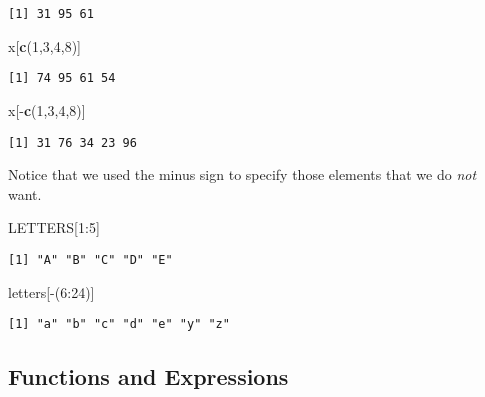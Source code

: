 \documentclass[]{book}
\newenvironment{Shaded}{\begin{snugshade}}{\end{snugshade}}
\newcommand{\KeywordTok}[1]{\textcolor[rgb]{0.13,0.29,0.53}{\textbf{{#1}}}}
\newcommand{\DecValTok}[1]{\textcolor[rgb]{0.00,0.00,0.81}{{#1}}}
\newcommand{\NormalTok}[1]{{#1}}
\numberwithin{equation}{chapter}
\numberwithin{figure}{chapter}
\theoremstyle{plain}
\theoremstyle{definition}
\theoremstyle{remark}
\theoremstyle{definition}
\theoremstyle{definition}
\theoremstyle{remark}
\begin{document}
\begin{verbatim}
[1] 31 95 61
\end{verbatim}

\begin{Shaded}
\begin{Highlighting}[]
\NormalTok{x[}\KeywordTok{c}\NormalTok{(}\DecValTok{1}\NormalTok{,}\DecValTok{3}\NormalTok{,}\DecValTok{4}\NormalTok{,}\DecValTok{8}\NormalTok{)]}
\end{Highlighting}
\end{Shaded}

\begin{verbatim}
[1] 74 95 61 54
\end{verbatim}

\begin{Shaded}
\begin{Highlighting}[]
\NormalTok{x[-}\KeywordTok{c}\NormalTok{(}\DecValTok{1}\NormalTok{,}\DecValTok{3}\NormalTok{,}\DecValTok{4}\NormalTok{,}\DecValTok{8}\NormalTok{)]}
\end{Highlighting}
\end{Shaded}

\begin{verbatim}
[1] 31 76 34 23 96
\end{verbatim}

Notice that we used the minus sign to specify those elements that we do
\emph{not} want.

\begin{Shaded}
\begin{Highlighting}[]
\NormalTok{LETTERS[}\DecValTok{1}\NormalTok{:}\DecValTok{5}\NormalTok{]}
\end{Highlighting}
\end{Shaded}

\begin{verbatim}
[1] "A" "B" "C" "D" "E"
\end{verbatim}

\begin{Shaded}
\begin{Highlighting}[]
\NormalTok{letters[-(}\DecValTok{6}\NormalTok{:}\DecValTok{24}\NormalTok{)]}
\end{Highlighting}
\end{Shaded}

\begin{verbatim}
[1] "a" "b" "c" "d" "e" "y" "z"
\end{verbatim}

\subsection{Functions and
Expressions}\label{sub-Functions-and-Expressions}
\end{document}
